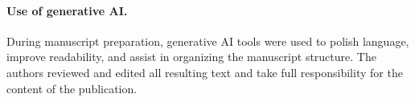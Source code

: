 \documentclass[12pt]{article}
\begin{document}
\paragraph{Use of generative AI.}
During manuscript preparation, generative AI tools were used to polish language, improve
readability, and assist in organizing the manuscript structure. The authors reviewed and
edited all resulting text and take full responsibility for the content of the publication.


\end{document}
